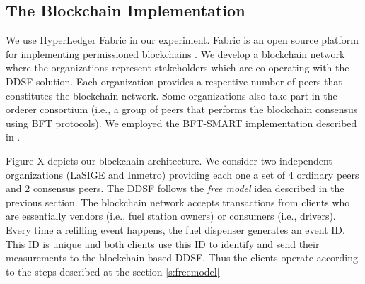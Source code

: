 \documentclass[sigplan]{acmart}
\begin{document}

\subsection{The Blockchain Implementation}
We use HyperLedger Fabric in our experiment.
Fabric is an open source platform for implementing permissioned blockchains \cite{Androulaki2018}.
We develop a blockchain network where the organizations represent stakeholders which are co-operating with the DDSF solution.
Each organization provides a respective number of peers that constitutes the blockchain network.
Some organizations also take part in the orderer consortium (i.e., a group of peers that performs the blockchain consensus using BFT protocols).
We employed the BFT-SMART implementation described in \cite{Sousa2017}.

Figure X depicts our blockchain architecture. 
We consider two independent organizations (LaSIGE and Inmetro) providing each one a set of 4 ordinary peers and 2 consensus peers.
The DDSF follows the \emph{free model} idea described in the previous section.
The blockchain network accepts transactions from clients who are essentially vendors (i.e., fuel station owners) or consumers (i.e., drivers).
Every time a refilling event happens, the fuel dispenser generates an event ID.
This ID is unique and both clients use this ID to identify and send their measurements to the blockchain-based DDSF.
Thus the clients operate according to the steps described at the section \ref{s:freemodel}
\end{document}
